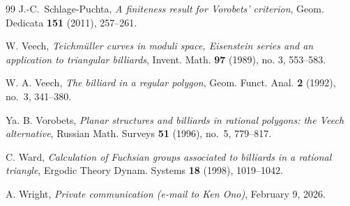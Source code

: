 \documentclass[12pt]{amsart}
\theoremstyle{definition}
\begin{document}
\begin{thebibliography}{99}
J.-C.~Schlage-Puchta,
\emph{A finiteness result for Vorobets' criterion},
Geom. Dedicata \textbf{151} (2011), 257--261.



W. Veech,
\emph{Teichm\"uller curves in moduli space, Eisenstein series and an application to triangular billiards},
Invent. Math. \textbf{97} (1989), no. 3, 553--583.

W. A. Veech,
\emph{The billiard in a regular polygon},
Geom. Funct. Anal. \textbf{2} (1992), no.~3, 341--380.


Ya. B. Vorobets,
\emph{Planar structures and billiards in rational polygons: the Veech alternative},
Russian Math. Surveys \textbf{51} (1996), no.~5, 779--817.


C. Ward,
\emph{Calculation of Fuchsian groups associated to billiards in a rational triangle},
Ergodic Theory Dynam. Systems \textbf{18} (1998), 1019--1042.

 A. Wright, \emph{Private communication (e-mail to Ken Ono)}, February 9, 2026.

\end{thebibliography}
\end{document}
